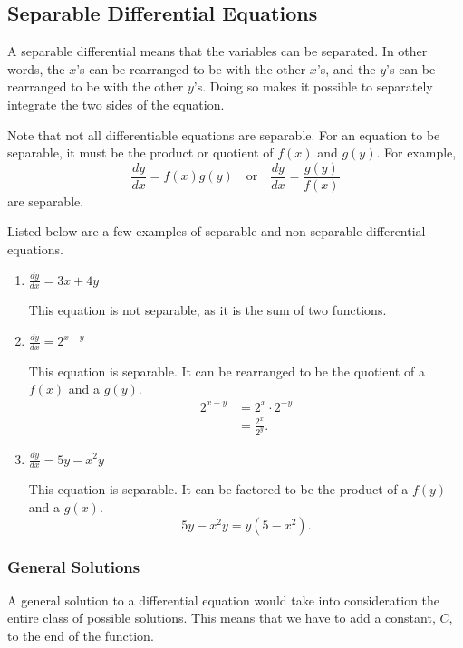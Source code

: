 \documentclass[12pt]{article}
\begin{document}
        \subsection{Separable Differential Equations}
            A separable differential means that the variables can be separated. In other words, the $x$'s can be rearranged to be with the other $x$'s, and the $y$'s can be rearranged to be with the other $y$'s. Doing so makes it possible to separately integrate the two sides of the equation.

            Note that not all differentiable equations are separable. For an equation to be separable, it must be the product or quotient of $f(x)$ and $g(y)$. For example,
            \[ \frac{dy}{dx} = f(x) g(y) \quad \text{or} \quad \frac{dy}{dx} = \frac{g(y)}{f(x)} \]
            are separable.

            Listed below are a few examples of separable and non-separable differential equations.
            \begin{enumerate}
                \item $\frac{dy}{dx} = 3x + 4y$

                This equation is not separable, as it is the sum of two functions.
                \bigskip

                \item $\frac{dy}{dx} = 2^{x-y}$

                This equation is separable. It can be rearranged to be the quotient of a $f(x)$ and a $g(y)$.
                \begin{align*}
                    2^{x-y} &= 2^x \cdot 2^{-y} \\
                    &= \frac{2^x}{2^y}.
                \end{align*}

                \item $\frac{dy}{dx} = 5y - x^2 y$

                This equation is separable. It can be factored to be the product of a $f(y)$ and a $g(x)$.
                \[ 5y - x^2 y = y(5-x^2). \]
            \end{enumerate}

            \subsubsection{General Solutions}
                A general solution to a differential equation would take into consideration the entire class of possible solutions. This means that we have to add a constant, $C$, to the end of the function.
\end{document}
